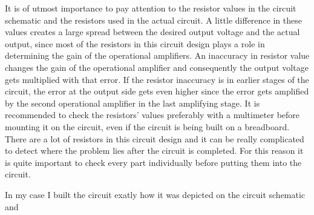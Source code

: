 It is of utmost importance to pay attention to the resistor values in the circuit schematic and the resistors used in the actual circuit. A little difference in these values creates a large spread between the desired output voltage and the actual output, since most of the resistors in this circuit design plays a role in determining the gain of the operational amplifiers. An inaccuracy in resistor value changes the gain of the operational amplifier and consequently the output voltage gets multiplied with that error. If the resistor inaccuracy is in earlier stages of the circuit, the error at the output side gets even higher since the error gets amplified by the second operational amplifier in the last amplifying stage. It is recommended to check the resistors' values preferably with a multimeter before mounting it on the circuit, even if the circuit is being built on a breadboard. There are a lot of resistors in this circuit design and it can be really complicated to detect where the problem lies after the circuit is completed. For this reason it is quite important to check every part individually before putting them into the circuit. \par 
In my case I built the circuit exatly how it was depicted on the circuit schematic and       